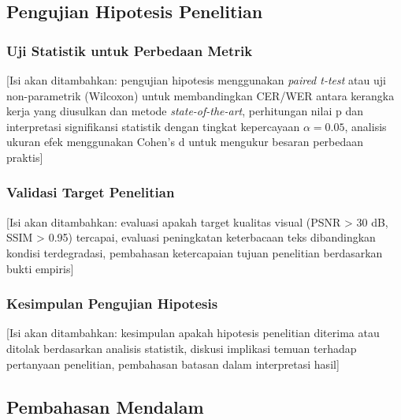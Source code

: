 \documentclass[12pt,a4paper]{article}
\begin{document}
\subsection{Pengujian Hipotesis Penelitian}
\label{subsec:pengujian-hipotesis}
\vspace{0.8em}

\subsubsection{Uji Statistik untuk Perbedaan Metrik}
\label{subsubsec:uji-statistik}

[Isi akan ditambahkan: pengujian hipotesis menggunakan \textit{paired t-test} atau uji non-parametrik (Wilcoxon) untuk membandingkan CER/WER antara kerangka kerja yang diusulkan dan metode \textit{state-of-the-art}, perhitungan nilai p dan interpretasi signifikansi statistik dengan tingkat kepercayaan $\alpha = 0.05$, analisis ukuran efek menggunakan Cohen's d untuk mengukur besaran perbedaan praktis]

\vspace{0.8em}

\subsubsection{Validasi Target Penelitian}
\label{subsubsec:validasi-target}

[Isi akan ditambahkan: evaluasi apakah target kualitas visual (PSNR > 30 dB, SSIM > 0.95) tercapai, evaluasi peningkatan keterbacaan teks dibandingkan kondisi terdegradasi, pembahasan ketercapaian tujuan penelitian berdasarkan bukti empiris]

\vspace{0.8em}

\subsubsection{Kesimpulan Pengujian Hipotesis}
\label{subsubsec:kesimpulan-hipotesis}

[Isi akan ditambahkan: kesimpulan apakah hipotesis penelitian diterima atau ditolak berdasarkan analisis statistik, diskusi implikasi temuan terhadap pertanyaan penelitian, pembahasan batasan dalam interpretasi hasil]

\vspace{0.8em}

\subsection{Pembahasan Mendalam}
\label{subsec:pembahasan-mendalam}
\vspace{0.8em}
\end{document}

